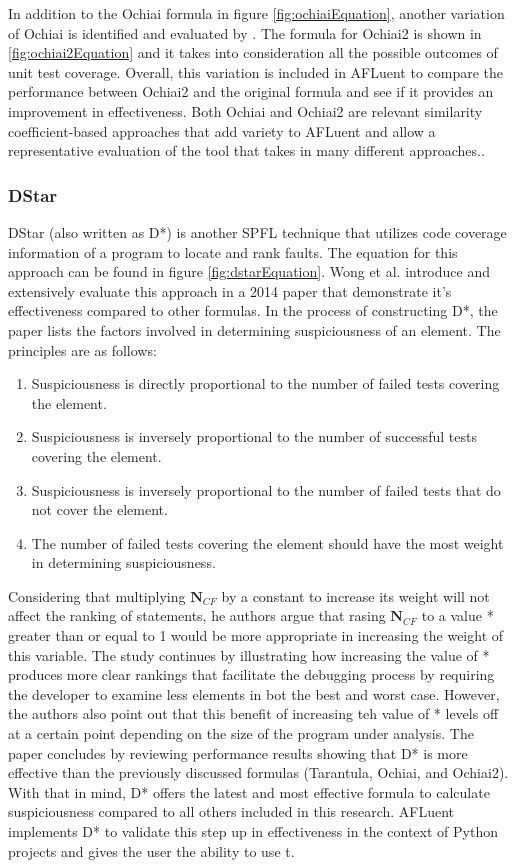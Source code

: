 In addition to the Ochiai formula in figure \ref{fig:ochiaiEquation}, another
variation of Ochiai is identified and evaluated by \cite{naish2011model}. The
formula for Ochiai2 is shown in \ref{fig:ochiai2Equation} and it takes into
consideration all the possible outcomes of unit test coverage. Overall, this
variation is included in AFLuent to compare the performance between Ochiai2 and
the original formula and see if it provides an improvement in effectiveness.
Both Ochiai and Ochiai2 are relevant similarity coefficient-based approaches
that add variety to AFLuent and allow a representative evaluation of the tool
that takes in many different approaches..

\subsubsection{DStar}
\label{subsubsec:dstar_lit}

DStar (also written as D*) is another SPFL technique that utilizes code coverage
information of a program to locate and rank faults. The equation for this
approach can be found in figure \ref{fig:dstarEquation}. Wong et al.
\cite{Wong2014DStar} introduce and extensively evaluate this approach in a 2014
paper that demonstrate it's effectiveness compared to other formulas. In the
process of constructing D*, the paper lists the factors involved in determining
suspiciousness of an element. The principles are as follows:
\begin{enumerate}
	\item Suspiciousness is directly proportional to the number of failed tests
	covering the element.
	\item Suspiciousness is inversely proportional to the number of successful tests
	covering the element.
	\item Suspiciousness is inversely proportional to the number of failed tests
	that do not cover the element.
	\item The number of failed tests covering the element should have the most
	weight in determining suspiciousness.
\end{enumerate}

Considering that multiplying \(\textbf{N$_{CF}$}\) by a constant to increase its
weight will not affect the ranking of statements, he authors argue that
rasing \(\textbf{N$_{CF}$}\) to a value * greater than
or equal to 1 would be more appropriate in increasing the weight of this
variable. The study continues by illustrating how increasing the value of *
produces more clear rankings that facilitate the debugging process by requiring
the developer to examine less elements in bot the best and worst case. However,
the authors also point out that this benefit of increasing teh value of * levels
off at a certain point depending on the size of the program under analysis.
The paper concludes by reviewing performance results showing that D* is more
effective than the previously discussed formulas (Tarantula, Ochiai, and
Ochiai2). With that in mind, D* offers the latest and most effective formula to
calculate suspiciousness compared to all others included in this research.
AFLuent implements D* to validate this step up in effectiveness in the context of
Python projects and gives the user the ability to use t.

